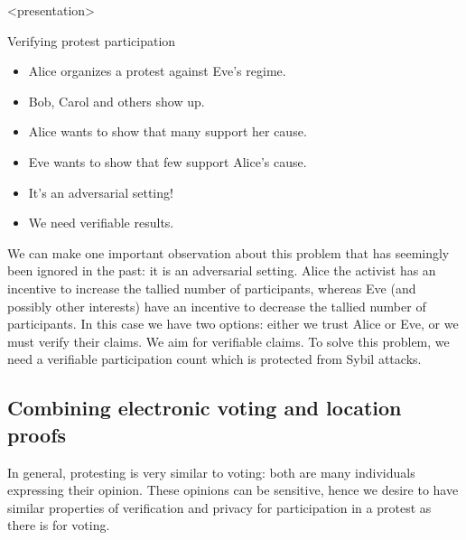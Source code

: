 \begin{frame}<presentation>
  \begin{block}{Verifying protest participation}
    \begin{itemize}
      \item Alice organizes a protest against Eve's regime.
      \item Bob, Carol and others show up.

        \pause{}

      \item {\color{green} Alice wants to show that many support her cause.}

        \pause{}

      \item {\color{red} Eve wants to show that few support Alice's cause.}
      \item It's an adversarial setting!
      \item We need verifiable results.
    \end{itemize}
  \end{block}
\end{frame}

We can make one important observation about this problem that has seemingly 
been ignored in the past: it is an adversarial setting.
Alice the activist has an incentive to increase the tallied number of 
participants, whereas Eve (and possibly other interests) have an incentive to 
decrease the tallied number of participants.
In this case we have two options:
either we trust Alice or Eve, or we must verify their claims.
We aim for verifiable claims.
To solve this problem, we need a verifiable participation count which is 
protected from Sybil attacks.

\subsection{Combining electronic voting and location proofs}

In general, protesting is very similar to voting: both are many individuals 
expressing their opinion.
These opinions can be sensitive, hence we desire to have similar properties of 
verification and privacy for participation in a protest as there is for voting.

